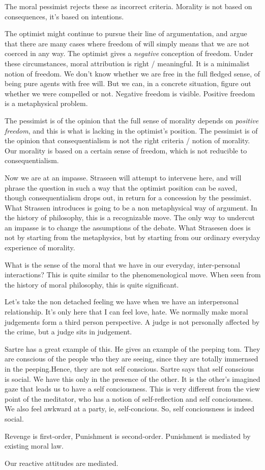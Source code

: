 \documentclass[11pt]{book}
\begin{document}
The moral pessimist rejects these as incorrect criteria. Morality is not
based on consequences, it's based on intentions.

The optimist might continue to pursue their line of argumentation, and
argue that there are many cases where freedom of will simply means that we 
are not coerced in any way. The optimist gives a \emph{negative} conception
of freedom. Under these circumstances, moral attribution is right / meaningful.
It is a minimalist notion of freedom. We don't know whether we are free in the
full fledged sense, of being pure agents with free will. But we can, in a 
concrete situation, figure out whether we were compelled or not. Negative
freedom is visible. Positive freedom is a metaphysical problem.

The pessimist is of the opinion that the full sense of morality depends on
\emph{positive freedom}, and this is what is lacking in the optimist's 
position.  The pessimist is of the opinion that
consequentialism is not the right criteria / notion of morality. Our
morality is based on a certain sense of freedom, which is not reducible to
consequentialism.

Now we are at an impasse. Straseen  will attempt to intervene here, and will
phrase the question in such a way that the optimist position can be saved,
though consequentialism drops out, in return for a concession by the
pessimist. What Strassen introduces is going to be a non metaphysical way
of argument. In the history of philosophy, this is a recognizable move. The only
way to undercut an impasse is to change the assumptions of the debate. What
Strasesen does is not by starting from the metaphysics, but by starting
from our ordinary everyday experience of morality. 

What is the sense of the moral that we have in our everyday, inter-personal
interactions? This is quite similar to the phenomenological move. When
seen from the history of moral philosophy, this is quite significant.


Let's take the non detached feeling we have when we have an interpersonal
relationship.  It's only here that I can feel love, hate. We normally make
moral judgements form a third person perspective. A judge is not personally
affected by the crime, but a judge sits in judgement.

Sartre has a great example of this. He gives an example of the peeping tom.
They are conscious of the people who they are seeing, since they 
are totally immernsed in the peeping.Hence, they are not self conscious.
Sartre says that self conscious is social. We have this only in the
presence of the other. It is the other's imagined gaze that leads us to
have a self conciousness. This is very different from the view point of
the meditator, who has a notion of self-reflection and self conciousness.
We also feel awkward at a party, ie, self-concious. So, self conciousness is
indeed social.

Revenge is first-order, Punishment is second-order. Punishment is mediated
by existing moral law.

Our reactive attitudes are mediated.
\end{document}
